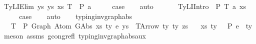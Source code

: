 \begin{isabellebody}
\ {\isacharparenleft}{\kern0pt}TyLIElim{}\ ys\ ys{\isacharprime}{\kern0pt}\ xs\ T\ {\isasymGamma}\ P\ a{\isacharparenright}{\kern0pt}\isanewline
\ \ \isamarkupfalse%
\ \isamarkupfalse%
\ {\isacharquery}{\kern0pt}case\isanewline
\ \ \isamarkupfalse%
\ auto\isanewline
\ \ \isamarkupfalse%
\isanewline
{}\isamarkupfalse%
\isanewline
\ \ \isamarkupfalse%
\ {\isacharparenleft}{\kern0pt}TyLIIntro{}\ {\isasymGamma}\ P\ T\ a\ xs{\isacharparenright}{\kern0pt}\isanewline
\ \ \isamarkupfalse%
\ \isamarkupfalse%
\ {\isacharquery}{\kern0pt}case\isanewline
\ \ \isamarkupfalse%
\ auto\isanewline
\ \ \isamarkupfalse%
\isanewline
{}\isamarkupfalse%
%
\endisatagproof
{\isafoldproof}%
%
\isadelimproof
\isanewline
%
\endisadelimproof
\isanewline
\isanewline
\isanewline
{}\isamarkupfalse%
\ typing{\isacharunderscore}{\kern0pt}inv{\isacharunderscore}{\kern0pt}graph{\isacharunderscore}{\kern0pt}abs{\isacharcolon}{\kern0pt}\isanewline
\ \ \ T{\isacharcolon}{\kern0pt}\ {\isachardoublequoteopen}{\isasymGamma}\ {\isasymturnstile}{\isacharbraceleft}{\kern0pt}P{\isacharbraceright}{\kern0pt}\ Graph\ {\isacharparenleft}{\kern0pt}Atom\ {\isacharparenleft}{\kern0pt}GAbs\ xs\ ty{}\ e{\isacharparenright}{\kern0pt}\ ys{\isacharparenright}{\kern0pt}\ {\isacharcolon}{\kern0pt}\ TArrow\ ty{}\ ty{}\ zs{\isachardoublequoteclose}\isanewline
\ \ \ {\isachardoublequoteopen}{\isacharparenleft}{\kern0pt}xs{\isacharcomma}{\kern0pt}\ ty{}{\isacharparenright}{\kern0pt}\ {\isacharhash}{\kern0pt}\ {\isasymGamma}\ {\isasymturnstile}{\isacharbraceleft}{\kern0pt}P{\isacharbraceright}{\kern0pt}\ e\ {\isacharcolon}{\kern0pt}\ ty{}{\isachardoublequoteclose}\isanewline
%
\isadelimproof
%
\endisadelimproof
%
\isatagproof
{}\isamarkupfalse%
\ {\isacharparenleft}{\kern0pt}meson\ assms\ gcong{\isachardot}{\kern0pt}refl\ typing{\isacharunderscore}{\kern0pt}inv{\isacharunderscore}{\kern0pt}graph{\isacharunderscore}{\kern0pt}abs{\isacharunderscore}{\kern0pt}aux{\isacharparenright}{\kern0pt}%
\endisatagproof
{\isafoldproof}%
%
\isadelimproof
%
\endisadelimproof
%
\isadelimdocument
%
\endisadelimdocument
%
\isatagdocument
%
\isamarkuptrue%
%
\endisatagdocument
{\isafolddocument}%
%
\isadelimdocument

\end{isabellebody}
